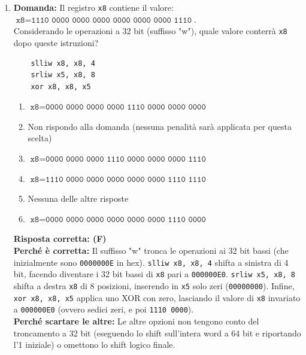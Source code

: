 \documentclass[12pt, a4paper]{article}
\begin{document}
\begin{enumerate}
    \item \textbf{Domanda:} Il registro \texttt{x8} contiene il valore: \\ $\texttt{x8} = \texttt{1110 0000 0000 0000 0000 0000 0000 1110}$. \\ Considerando le operazioni a 32 bit (suffisso "w"), quale valore conterrà \texttt{x8} dopo queste istruzioni?\\
    \begin{verbatim}
    slliw x8, x8, 4
    srliw x5, x8, 8
    xor x8, x8, x5
    \end{verbatim}
    \begin{enumerate}[label=(\Alph*)]
        \item $\texttt{x8} = \texttt{0000 0000 0000 0000 1110 0000 0000 0000}$
        \item Non rispondo alla domanda (nessuna penalità sarà applicata per questa scelta)
        \item $\texttt{x8} = \texttt{0000 0000 0000 1110 0000 0000 0000 1110}$
        \item $\texttt{x8} = \texttt{1110 0000 0000 0000 0000 0000 1110 1110}$
        \item Nessuna delle altre risposte
        \item $\texttt{x8} = \texttt{0000 0000 0000 0000 0000 0000 1110 0000}$
    \end{enumerate}
    \textbf{Risposta corretta: (F)} \\
    \textbf{Perché è corretta:} Il suffisso "w" tronca le operazioni ai 32 bit bassi (che inizialmente sono \texttt{0000000E} in hex). \texttt{slliw x8, x8, 4} shifta a sinistra di 4 bit, facendo diventare i 32 bit bassi di \texttt{x8} pari a \texttt{000000E0}. \texttt{srliw x5, x8, 8} shifta a destra \texttt{x8} di 8 posizioni, inserendo in \texttt{x5} solo zeri (\texttt{00000000}). Infine, \texttt{xor x8, x8, x5} applica uno XOR con zero, lasciando il valore di \texttt{x8} invariato a \texttt{000000E0} (ovvero sedici zeri, e poi \texttt{1110 0000}). \\
    \textbf{Perché scartare le altre:} Le altre opzioni non tengono conto del troncamento a 32 bit (eseguendo lo shift sull'intera word a 64 bit e riportando l'1 iniziale) o omettono lo shift logico finale.
    

\end{enumerate}
\end{document}
